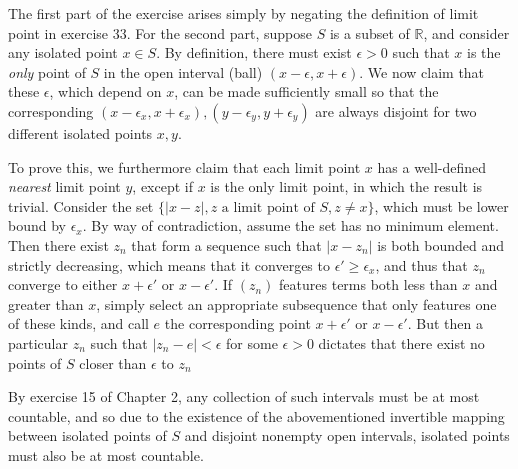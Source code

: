 \begin{solution}

    The first part of the exercise arises simply by negating the definition of limit point in exercise 33.
    For the second part, suppose $S$ is a subset of $\mathbb{R}$, and consider any isolated point $x \in S$.
    By definition, there must exist $\epsilon > 0$ such that $x$ is the \textit{only} point of $S$ in the open interval (ball) $(x - \epsilon, x + \epsilon)$.
    We now claim that these $\epsilon$, which depend on $x$, can be made sufficiently small so that the corresponding $(x - \epsilon_x, x + \epsilon_x), (y - \epsilon_y, y + \epsilon_y)$ are always disjoint for two different isolated points $x, y$.

    To prove this, we furthermore claim that each limit point $x$ has a well-defined \textit{nearest} limit point $y$, except if $x$ is the only limit point, in which the result is trivial.
    Consider the set $\{ \lvert x - z \rvert, z \text{ a limit point of } S, z \neq x\}$, which must be lower bound by $\epsilon_x$.
    By way of contradiction, assume the set has no minimum element.
    Then there exist $z_n$ that form a sequence such that $\lvert x - z_n \rvert$ is both bounded and strictly decreasing, which means that it converges to $\epsilon' \geq \epsilon_x$, and thus that $z_n$ converge to either $x + \epsilon'$ or $x - \epsilon'$.
    If $(z_n)$ features terms both less than $x$ and greater than $x$, simply select an appropriate subsequence that only features one of these kinds, and call $e$ the corresponding point $x + \epsilon'$ or $x - \epsilon'$.
    But then a particular $z_n$ such that $\lvert z_n - e \rvert < \epsilon$ for some $\epsilon > 0$ dictates that there exist no points of $S$ closer than $\epsilon$ to $z_n$

    By exercise 15 of Chapter 2, any collection of such intervals must be at most countable, and so due to the existence of the abovementioned invertible mapping between isolated points of $S$ and disjoint nonempty open intervals, isolated points must also be at most countable.
\end{solution}